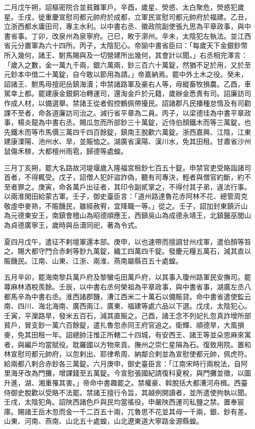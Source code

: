 \begin{pinyinscope}
 二月戊午朔，詔樞密院合並貧難軍戶。辛酉，歲星、熒惑、太白聚危，熒惑犯歲星。壬戌，徙重慶宣慰司都元帥府於成都，立軍民宣慰司都元帥府於福建。乙丑，立浙西都水庸田司，專主水利。以中書右丞、徽政院副使張九思為平章政事，與中書省事。丁卯，改泉州為泉寧府。己巳，畋于漷州。辛未，太陰犯左執法。並江西省元分置軍為六十四所。丙子，太陰犯心。帝諭中書省臣曰：「每歲天下金銀鈔幣所入幾何，諸王、駙馬賜與及一切營建所出幾何，其會計以聞。」右丞相完澤言：「歲入之數，金一萬九千兩，銀六萬兩，鈔三百六十萬錠，然猶不足於用，又於至元鈔本中借二十萬錠，自今敢以節用為請。」帝嘉納焉。罷中外土木之役。癸未，詔諸王、駙馬毋擅祀岳鎮海瀆；申禁諸路軍及豪右人等，毋縱畜牧損農。乙酉，車駕幸上都。罷建康金銀銅冶轉運司，還淘金戶於元籍，歲辦金悉責有司。詔廉訪司作成人材，以備選舉。禁諸王從者假控鶴佩帶擾民。詔諸郡凡民播種怠惰及有司勸課不至者，命各道廉訪司治之。減行省平章為二員。丙子，以梁德珪為中書平章政事，楊炎龍為中書右丞。賜瓜忽而所部鈔三十萬錠，近侍伯顏鐵木而等三萬錠，也先鐵木而等市馬價三萬四千四百餘錠，鎮南王脫歡六萬錠。浙西嘉興、江陰，江東建康溧陽、池州水、旱，並賑恤之。湖廣省漢陽、漢川水，免其田租。甘肅省沙州鼠傷禾稼，大都檀州雨雹，歸德等處蝗。



 三月丁亥朔，罷大名路故河堤堰歲入隆福宮租鈔七百五十錠。申禁官吏受賂詣諸司首者，不得輒受。戊子，詔僧人犯奸盜詐偽，聽有司專決，輕者與僧官約斷，約不至者罪之。庚寅，命各萬戶出征者，其印令副貳掌之，不得付其子弟，違法行事。以兩淮閑田給蒙古軍。壬子，御史臺臣言：「道州路達魯花赤阿林不花、總管周克敬虛申麥熟，不賑饑民，雖經赦宥，宜降職一等。」從之。壬子，詔加封東鎮沂山為元德東安王，南鎮會稽山為昭德順應王，西鎮吳山為成德永靖王，北鎮醫巫閭山為貞德廣寧王，歲時與岳瀆同祀，著為令式。



 夏四月戊午，遣征不剌壇軍還本部。庚申，以也速帶而擅調甘州戍軍，遣伯顏等笞之。賜大都守門合赤剌等鈔九萬錠，織工四萬四千錠。發慶元糧五萬石，減其直以賑饑民。江南、山東、江浙、兩淮、燕南屬縣百五十處蝗。



 五月辛卯，罷海南黎兵萬戶府及黎蠻屯田萬戶府，以其事入瓊州路軍民安撫司。罷蕁麻林酒稅羨餘。壬辰，以中書右丞何榮祖為平章政事，與中書省事，湖廣左丞八都馬辛為中書右丞。淮西諸郡饑，漕江西米二十萬石以備賑貸。命中書省遣使監云南、四川、海北海南、廣西兩江、廣東、福建等處六品以下選。戊戌，太陰犯心。壬寅，平灤路旱，發米五百石，減其直賑之。己酉，諸王念不列妃扎忽真詐增所部貧戶，冒支鈔一萬六百餘錠，遣扎魯忽赤同王府官追之。衛輝、順德旱，大風損麥，免其田租一年。詔總帥汪惟正所轄二十四城，有安西王、諸王等並朵思麻來寓者，與編戶均當賦役。耽羅國以方物來貢。撫州之崇仁星隕為石。復致用院。置和林宣慰司都元帥府，以忽剌出、耶律希周、納鄰合剌並為宣慰使都元帥，佩虎符。給兩都八剌合赤鈔各三萬錠。六月庚申，御史臺臣言：「江南宋時行兩稅法，自阿里海牙改為門攤，增課錢至五萬錠。今宣慰張國紀請復科夏稅，與門攤並徵，以圖升進，湖、湘重罹其害。」帝命中書趣罷之。禁權豪、斡脫括大都漕河舟楫。西臺侍御史脫歡以受賂不法罷。禁諸王擅行令旨，其越例開讀者，並所遣使拘執以聞。壬戌，太陰犯角。詔陜西諸色戶與民均當徭役，申嚴陜西運司私鹽之禁。置奉宸庫。賜諸王岳木忽而金一千二百五十兩，兀魯思不花並其母一千兩，銀、鈔有差。山東、河南、燕南、山北五十處蝗，山北遼東道大寧路金源縣蝗。




\end{pinyinscope}
